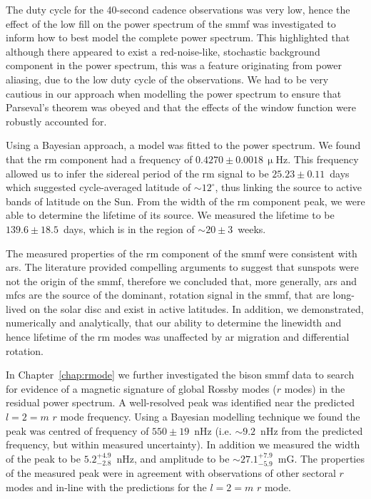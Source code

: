 The duty cycle for the 40-second cadence observations was very low, hence the effect of the low fill on the power spectrum of the \gls{smmf} was investigated to inform how to best model the complete power spectrum. This highlighted that although there appeared to exist a red-noise-like, stochastic background component in the power spectrum, this was a feature originating from power aliasing, due to the low duty cycle of the observations. We had to be very cautious in our approach when modelling the power spectrum to ensure that Parseval's theorem was obeyed and that the effects of the window function were robustly accounted for.

Using a Bayesian approach, a model was fitted to the power spectrum. We found that the \gls{rm} component had a frequency of $0.4270\pm0.0018\,\upmu\mathrm{Hz}$. This frequency allowed us to infer the sidereal period of the \gls{rm} signal to be $25.23\pm0.11$~days which suggested cycle-averaged latitude of $\sim$$12^{\circ}$, thus linking the source to active bands of latitude on the Sun. From the width of the \gls{rm} component peak, we were able to determine the lifetime of its source. We measured the lifetime to be $139.6\pm18.5$~days, which is in the region of $\sim$$20\pm3$~weeks.

The measured properties of the \gls{rm} component of the \gls{smmf} were consistent with \glspl{ar}. The literature provided compelling arguments to suggest that sunspots were not the origin of the \gls{smmf}, therefore we concluded that, more generally, \glspl{ar} and \glspl{mfc} are the source of the dominant, rotation signal in the \gls{smmf}, that are long-lived on the solar disc and exist in active latitudes. In addition, we demonstrated, numerically and analytically, that our ability to determine the linewidth and hence lifetime of the \gls{rm} modes was unaffected by \gls{ar} migration and differential rotation.


In Chapter~\ref{chap:rmode} we further investigated the \gls{bison} \gls{smmf} data to search for evidence of a magnetic signature of global Rossby modes ($r$ modes) in the residual power spectrum. A well-resolved peak was identified near the predicted $l=2=m$ $r$ mode frequency. Using a Bayesian modelling technique we found the peak was centred of frequency of $550\pm19$~nHz (i.e. $\sim$$9.2$~nHz from the predicted frequency, but within measured uncertainty). In addition we measured the width of the peak to be $5.2^{+4.9}_{-2.8}$~nHz, and amplitude to be $\sim$$ 27.1^{+7.9}_{-5.9}$~mG. The properties of the measured peak were in agreement with observations of other sectoral $r$ modes and in-line with the predictions for the $l=2=m$ $r$ mode.

